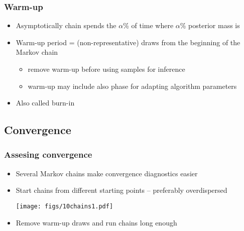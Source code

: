 \documentclass[10pt]{beamer}
\begin{document}
\begin{frame}

\frametitle{Warm-up}

  \begin{itemize}
  \item Asymptotically chain spends the $\alpha$\% of time where
    $\alpha$\% posterior mass is
      \vspace{-.5\baselineskip}
    \item<3-> Warm-up period = (non-representative) draws from the beginning of the Markov chain
    \begin{itemize}
      \item remove warm-up before using samples for inference
      \item warm-up may include also phase for adapting algorithm parameters
      \end{itemize}
    \item<4-> Also called {\color{uured} burn-in}
  \end{itemize}

\end{frame}

\subsection{Convergence}

\begin{frame}

\frametitle{Assesing convergence}

  \vspace{-0.5\baselineskip}
  \begin{itemize}
  \item Several Markov chains make convergence diagnostics easier
  \pause
    \item Start chains from different starting points -- preferably overdispersed
      \begin{center}
  \vspace{-0.5\baselineskip}
      \texttt{[image: figs/10chains1.pdf]}
    \end{center}
  \vspace{-0.5\baselineskip}
    \item<2-> Remove warm-up draws and run chains long enough
  \end{itemize}

\end{frame}
\end{document}
